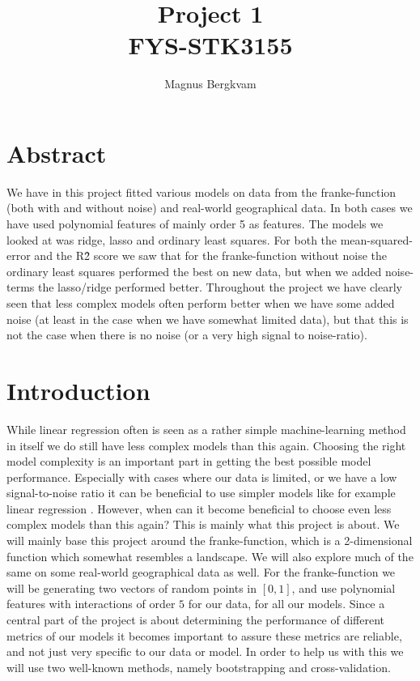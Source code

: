 \documentclass{article}
\author{Magnus Bergkvam}
\title{Project 1 \\ FYS-STK3155}
\begin{document}
\maketitle

\section{Abstract}
We have in this project fitted various models on data from the franke-function
(both with and without noise) and real-world geographical data. In both cases we
have used polynomial features of mainly order 5 as features.  The models we
looked at was ridge, lasso and ordinary least squares.  For both the
mean-squared-error and the R\^2 score we saw that for the franke-function
without noise the ordinary least squares performed the best on new data, but
when we added noise-terms the lasso/ridge performed better.  Throughout the
project we have clearly seen that less complex models often perform better when
we have some added noise (at least in the case when we have somewhat limited
data), but that this is not the case when there is no noise (or a very high
signal to noise-ratio).

\section{Introduction}
While linear regression often is seen as a rather simple machine-learning method
in itself we do still have less complex models than this again. Choosing the
right model complexity is an important part in getting the best possible model
performance. Especially with cases where our data is limited, or we have a low
signal-to-noise ratio it can be beneficial to use simpler models like for
example linear regression \cite{}. However, when can it become beneficial to
choose even less complex models than this again? This is mainly what this
project is about. We will mainly base this project around the franke-function,
which is a 2-dimensional function which somewhat resembles a landscape. We will
also explore much of the same on some real-world geographical data as well. For
the franke-function we will be generating two vectors of random points in
$\left[ 0, 1 \right]$, and use polynomial features with interactions of order
$5$ for our data, for all our models. Since a central part of the project is
about determining the performance of different metrics of our models it becomes
important to assure these metrics are reliable, and not just very specific to
our data or model. In order to help us with this we will use two well-known
methods, namely bootstrapping and cross-validation. \\
\end{document}
